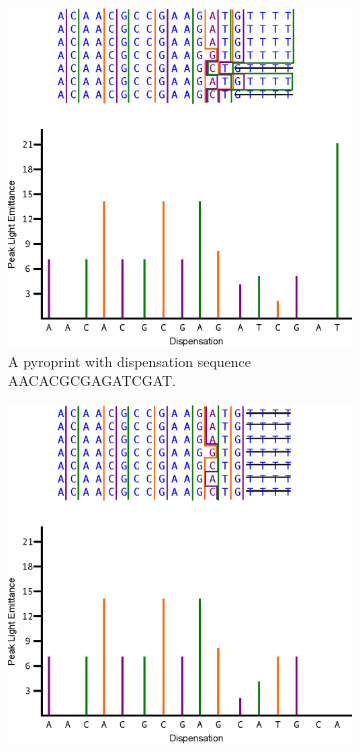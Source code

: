 \documentclass[12pt]{ucthesis}
\begin{document}
      \begin{figure}[t]
         \centering
         \begin{subfigure}[t]{0.45\textwidth}
            \centering
            \includegraphics[width=\textwidth]{graphics/PyroprintExample.eps}
            \caption{A pyroprint with dispensation sequence AACACGCGAGATCGAT.}
            \label{fig:dispensation_example1}
         \end{subfigure}
         \hfill
         \begin{subfigure}[t]{0.45\textwidth}
            \centering
            \includegraphics[width=\textwidth]{graphics/PyroprintExample2.eps}

\end{subfigure}
\end{figure}
\end{document}
